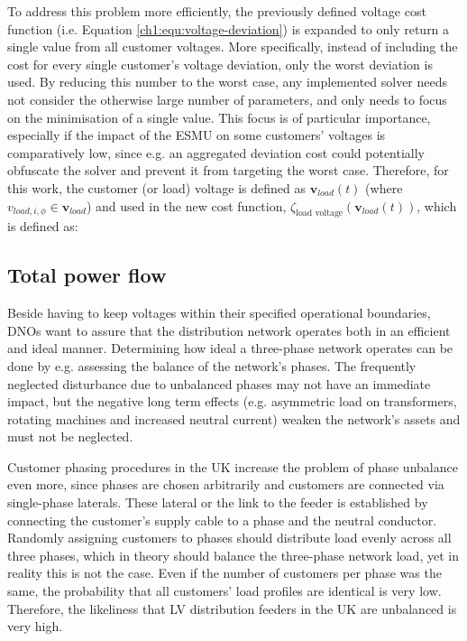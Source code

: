 To address this problem more efficiently, the previously defined voltage cost function (i.e. Equation \ref{ch1:equ:voltage-deviation}) is expanded to only return a single value from all customer voltages.
More specifically, instead of including the cost for every single customer's voltage deviation, only the worst deviation is used.
By reducing this number to the worst case, any implemented solver needs not consider the otherwise large number of parameters, and only needs to focus on the minimisation of a single value.
This focus is of particular importance, especially if the impact of the ESMU on some customers' voltages is comparatively low, since e.g. an aggregated deviation cost could potentially obfuscate the solver and prevent it from targeting the worst case.
Therefore, for this work, the customer (or load) voltage is defined as $\textbf{v}_{load}(t)$ (where $v_{load,i,\phi} \in \textbf{v}_{load}$) and used in the new cost function, $\zeta_\text{load voltage}(\textbf{v}_{load}(t))$, which is defined as:



\subsection{Total power flow}
\label{ch1:subsec:total-power-flow}

Beside having to keep voltages within their specified operational boundaries, DNOs want to assure that the distribution network operates both in an efficient and ideal manner.
Determining how ideal a three-phase network operates can be done by e.g. assessing the balance of the network's phases.
The frequently neglected disturbance due to unbalanced phases may not have an immediate impact, but the negative long term effects (e.g. asymmetric load on transformers, rotating machines and increased neutral current) weaken the network's assets and must not be neglected.

Customer phasing procedures in the UK increase the problem of phase unbalance even more, since phases are chosen arbitrarily and customers are connected via single-phase laterals.
These lateral or the link to the feeder is established by connecting the customer's supply cable to a phase and the neutral conductor.
Randomly assigning customers to phases should distribute load evenly across all three phases, which in theory should balance the three-phase network load, yet in reality this is not the case.
Even if the number of customers per phase was the same, the probability that all customers' load profiles are identical is very low.
Therefore, the likeliness that LV distribution feeders in the UK are unbalanced is very high.

